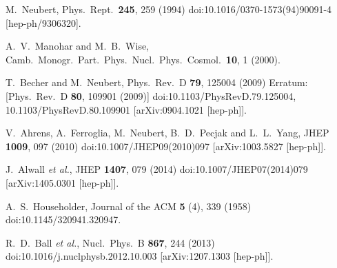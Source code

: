 \documentclass[11pt,a4paper]{article}
\begin{document}
\begin{thebibliography}{99}
  M.~Neubert,
  Phys.\ Rept.\  {\bf 245}, 259 (1994)
  doi:10.1016/0370-1573(94)90091-4
  [hep-ph/9306320].


  A.~V.~Manohar and M.~B.~Wise,
  Camb.\ Monogr.\ Part.\ Phys.\ Nucl.\ Phys.\ Cosmol.\  {\bf 10}, 1 (2000).


  T.~Becher and M.~Neubert,
  Phys.\ Rev.\ D {\bf 79}, 125004 (2009)
  Erratum: [Phys.\ Rev.\ D {\bf 80}, 109901 (2009)]
  doi:10.1103/PhysRevD.79.125004, 10.1103/PhysRevD.80.109901
  [arXiv:0904.1021 [hep-ph]].


  V.~Ahrens, A.~Ferroglia, M.~Neubert, B.~D.~Pecjak and L.~L.~Yang,
  JHEP {\bf 1009}, 097 (2010)
  doi:10.1007/JHEP09(2010)097
  [arXiv:1003.5827 [hep-ph]].


  J.~Alwall {\it et al.},
  JHEP {\bf 1407}, 079 (2014)
  doi:10.1007/JHEP07(2014)079
  [arXiv:1405.0301 [hep-ph]].

	
A.~S.~Householder,  
Journal of the ACM {\bf 5} (4), 339 (1958)
doi:10.1145/320941.320947.	

  R.~D.~Ball {\it et al.},
  Nucl.\ Phys.\ B {\bf 867}, 244 (2013)
  doi:10.1016/j.nuclphysb.2012.10.003
  [arXiv:1207.1303 [hep-ph]].



\end{thebibliography}
\end{document}
